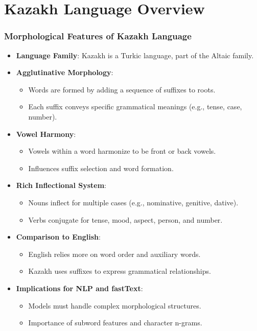 \documentclass{beamer}
\begin{document}
\section{Kazakh Language Overview}

\begin{frame}
    \frametitle{Morphological Features of Kazakh Language}
    \begin{itemize}
        \item \textbf{Language Family}: Kazakh is a Turkic language, part of the Altaic family.
        \item \textbf{Agglutinative Morphology}:
        \begin{itemize}
            \item Words are formed by adding a sequence of suffixes to roots.
            \item Each suffix conveys specific grammatical meanings (e.g., tense, case, number).
        \end{itemize}
        \item \textbf{Vowel Harmony}:
        \begin{itemize}
            \item Vowels within a word harmonize to be front or back vowels.
            \item Influences suffix selection and word formation.
        \end{itemize}
        \item \textbf{Rich Inflectional System}:
        \begin{itemize}
            \item Nouns inflect for multiple cases (e.g., nominative, genitive, dative).
            \item Verbs conjugate for tense, mood, aspect, person, and number.
        \end{itemize}
        \item \textbf{Comparison to English}:
        \begin{itemize}
            \item English relies more on word order and auxiliary words.
            \item Kazakh uses suffixes to express grammatical relationships.
        \end{itemize}
        \item \textbf{Implications for NLP and fastText}:
        \begin{itemize}
            \item Models must handle complex morphological structures.
            \item Importance of subword features and character n-grams.
        \end{itemize}
    \end{itemize}
\end{frame}
\end{document}
